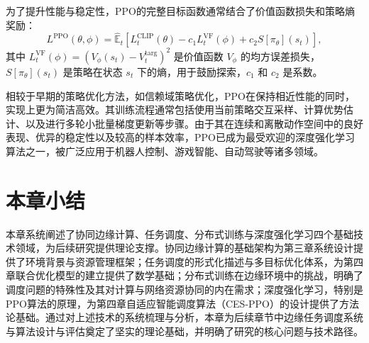 为了提升性能与稳定性，PPO的完整目标函数通常结合了价值函数损失和策略熵奖励：
\begin{equation}
    L^{\text{PPO}}(\theta, \phi) = \hat{\mathbb{E}}_t \left[ L^{\text{CLIP}}_t(\theta) - c_1 L^{\text{VF}}_t(\phi) + c_2 S[\pi_\theta](s_t) \right],
\end{equation}
其中 $L^{\text{VF}}_t(\phi) = (V_\phi(s_t) - V_t^{\text{targ}})^2$ 是价值函数 $V_\phi$ 的均方误差损失，$S[\pi_\theta](s_t)$ 是策略在状态 $s_t$ 下的熵，用于鼓励探索，$c_1$ 和 $c_2$ 是系数。

相较于早期的策略优化方法，如信赖域策略优化，PPO在保持相近性能的同时，实现上更为简洁高效。其训练流程通常包括使用当前策略交互采样、计算优势估计、以及进行多轮小批量梯度更新等步骤。由于其在连续和离散动作空间中的良好表现、优异的稳定性以及较高的样本效率，PPO已成为最受欢迎的深度强化学习算法之一，被广泛应用于机器人控制、游戏智能、自动驾驶等诸多领域\cite{10703056}。

\section{本章小结}
本章系统阐述了协同边缘计算、任务调度、分布式训练与深度强化学习四个基础技术领域，为后续研究提供理论支撑。协同边缘计算的基础架构为第三章系统设计提供了环境背景与资源管理框架；任务调度的形式化描述与多目标优化体系，为第四章联合优化模型的建立提供了数学基础；分布式训练在边缘环境中的挑战，明确了调度问题的特殊性及其对计算与网络资源协同的内在需求；深度强化学习，特别是PPO算法的原理，为第四章自适应智能调度算法（CES-PPO）的设计提供了方法论基础。通过对上述技术的系统梳理与分析，本章为后续章节中边缘任务调度系统与算法设计与评估奠定了坚实的理论基础，并明确了研究的核心问题与技术路径。